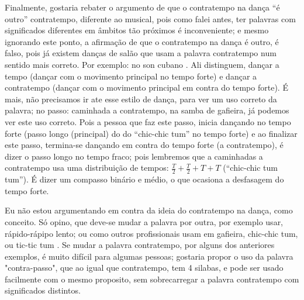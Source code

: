 Finalmente, gostaria rebater o argumento de que o contratempo na dança ``é outro'' contratempo, 
diferente ao musical, pois como falei antes, 
ter palavras com significados diferentes em âmbitos tão próximos é inconveniente; 
e mesmo ignorando este ponto, a afirmação de que o contratempo na dança é outro, é falso, 
pois já existem danças de salão que usam a palavra  contratempo num sentido mais correto. 
Por exemplo: no son cubano \cite[pp. 36-37]{borges2012historia}. 
Ali distinguem, dançar a tempo (dançar com o movimento principal no tempo forte) 
e dançar a contratempo (dançar com o movimento principal em contra do tempo forte). 
É mais, não precisamos ir ate esse estilo de dança, para ver um uso correto da palavra; 
no passo: caminhada a contratempo, na samba de gafieira, já podemos ver este uso correto. 
Pois a pessoa que faz este passo, 
inicia dançando no tempo forte (passo longo (principal) do do ``chic-chic tum'' no tempo forte) e ao finalizar este passo, 
termina-se dançando em contra do tempo forte (a contratempo), é dizer o passo longo no tempo fraco; 
pois lembremos que a caminhadas a contratempo usa uma distribuição de tempos: $\frac{T}{2}+\frac{T}{2}+T+T$  (``chic-chic tum tum''). 
É dizer um compasso binário e médio, o que ocasiona a desfasagem do tempo forte.

Eu não estou argumentando em contra da ideia do contratempo na dança, como conceito. 
Só opino, que deve-se mudar a palavra por outra, por exemplo usar, 
rápido-rápipo lento; ou como outros profissionais usam em gafieira, 
chic-chic tum, ou tic-tic tum \cite[pp. 146]{perna2002samba}. 
Se mudar a palavra contratempo, por alguns dos anteriores exemplos, é muito difícil para algumas pessoas; 
gostaria propor o uso da palavra "contra-passo", que ao igual que contratempo, tem 4 silabas, 
e pode ser usado facilmente com o mesmo proposito, sem sobrecarregar a palavra contratempo com significados distintos.

